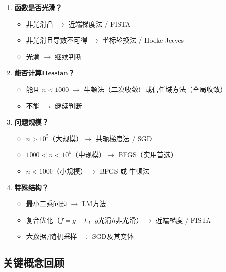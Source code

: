 \begin{conceptbox}[如何选择多维无约束优化方法]
\begin{enumerate}[label=\arabic*., leftmargin=2em]
    \item \textbf{函数是否光滑？}
    \begin{itemize}
        \item 非光滑凸 $\rightarrow$ 近端梯度法 / FISTA
        \item 非光滑且导数不可得 $\rightarrow$ 坐标轮换法 / Hooke-Jeeves
        \item 光滑 $\rightarrow$ 继续判断
    \end{itemize}
    \item \textbf{能否计算Hessian？}
    \begin{itemize}
        \item 能且 $n < 1000$ $\rightarrow$ 牛顿法（二次收敛）或信任域方法（全局收敛）
        \item 不能 $\rightarrow$ 继续判断
    \end{itemize}
    \item \textbf{问题规模？}
    \begin{itemize}
        \item $n > 10^5$（大规模）$\rightarrow$ 共轭梯度法 / SGD
        \item $1000 < n < 10^5$（中规模）$\rightarrow$ BFGS（实用首选）
        \item $n < 1000$（小规模）$\rightarrow$ BFGS 或 牛顿法
    \end{itemize}
    \item \textbf{特殊结构？}
    \begin{itemize}
        \item 最小二乘问题 $\rightarrow$ LM方法
        \item 复合优化（$f = g + h$，$g$光滑$h$非光滑）$\rightarrow$ 近端梯度 / FISTA
        \item 大数据/随机采样 $\rightarrow$ SGD及其变体
    \end{itemize}
\end{enumerate}
\end{conceptbox}

\subsection{关键概念回顾}

